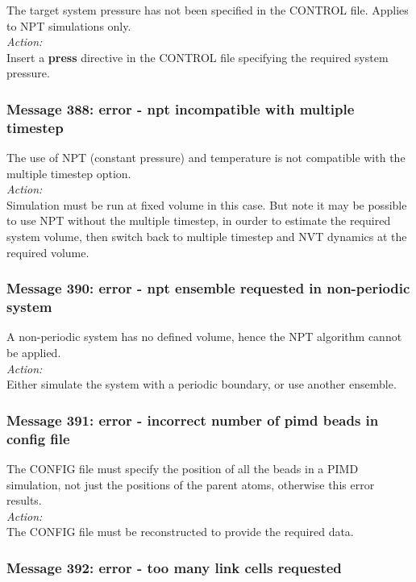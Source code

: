 The target system pressure has not been specified in the CONTROL file.
Applies to NPT simulations only. \\

\noindent
{\em Action:}\\
Insert a {\bf press} directive in the CONTROL file specifying the
required system pressure.

\subsubsection*{Message 388: error - npt incompatible with multiple timestep}

The use of NPT (constant pressure) and temperature is not compatible
with the multiple timestep option.\\

\noindent
{\em Action:}\\
Simulation must be run at fixed volume in this case. But note it may
be possible to use NPT without the multiple timestep, in ourder to
estimate the required system volume, then switch back to multiple
timestep and NVT dynamics at the required volume.

\subsubsection*{Message 390: error - npt ensemble requested in
non-periodic system}

A non-periodic system has no defined volume, hence the NPT algorithm
cannot be applied.\\

\noindent
{\em Action:} \\ Either simulate the system with a periodic boundary,
or use another ensemble.

\subsubsection*{Message 391: error - incorrect number of pimd beads in config file}

The CONFIG file must specify the position of all the beads in a PIMD
simulation, not just the positions of the parent atoms, otherwise this
error results. \\

\noindent
{\em Action:}\\
The CONFIG file must be reconstructed to provide the required data.

\subsubsection*{Message 392: error - too many link cells requested}

